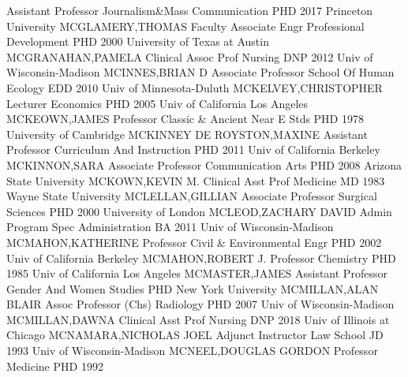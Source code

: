 \documentclass[
]{article}
\begin{document}
\textbar{}  \textbar Assistant Professor
\textbar Journalism\&Mass Communication \textbar PHD 2017 Princeton
University \textbar MCGLAMERY,THOMAS \textbar{} 
\textbar Faculty Associate \textbar Engr Professional Development
\textbar PHD 2000 University of Texas at Austin
\textbar MCGRANAHAN,PAMELA \textbar{}  \textbar Clinical
Assoc Prof \textbar Nursing \textbar DNP 2012 Univ of Wisconsin-Madison
\textbar MCINNES,BRIAN D \textbar{}  \textbar Associate
Professor \textbar School Of Human Ecology \textbar EDD 2010 Univ of
Minnesota-Duluth \textbar MCKELVEY,CHRISTOPHER \textbar{} 
\textbar Lecturer \textbar Economics \textbar PHD 2005 Univ of
California Los Angeles \textbar MCKEOWN,JAMES \textbar{} 
\textbar Professor \textbar Classic \& Ancient Near E Stds \textbar PHD
1978 University of Cambridge \textbar MCKINNEY DE ROYSTON,MAXINE
\textbar{}  \textbar Assistant Professor \textbar Curriculum
And Instruction \textbar PHD 2011 Univ of California Berkeley
\textbar MCKINNON,SARA \textbar{}  \textbar Associate
Professor \textbar Communication Arts \textbar PHD 2008 Arizona State
University \textbar MCKOWN,KEVIN M. \textbar{} 
\textbar Clinical Asst Prof \textbar Medicine \textbar MD 1983 Wayne
State University \textbar MCLELLAN,GILLIAN \textbar{} 
\textbar Associate Professor \textbar Surgical Sciences \textbar PHD
2000 University of London \textbar MCLEOD,ZACHARY DAVID \textbar{}
 \textbar Admin Program Spec \textbar Administration
\textbar BA 2011 Univ of Wisconsin-Madison \textbar MCMAHON,KATHERINE
\textbar{}  \textbar Professor \textbar Civil \&
Environmental Engr \textbar PHD 2002 Univ of California Berkeley
\textbar MCMAHON,ROBERT J. \textbar{}  \textbar Professor
\textbar Chemistry \textbar PHD 1985 Univ of California Los Angeles
\textbar MCMASTER,JAMES \textbar{}  \textbar Assistant
Professor \textbar Gender And Women Studies \textbar PHD New York
University \textbar MCMILLAN,ALAN BLAIR \textbar{} 
\textbar Assoc Professor (Chs) \textbar Radiology \textbar PHD 2007 Univ
of Wisconsin-Madison \textbar MCMILLAN,DAWNA \textbar{} 
\textbar Clinical Asst Prof \textbar Nursing \textbar DNP 2018 Univ of
Illinois at Chicago \textbar MCNAMARA,NICHOLAS JOEL \textbar{}
 \textbar Adjunct Instructor \textbar Law School \textbar JD
1993 Univ of Wisconsin-Madison \textbar MCNEEL,DOUGLAS GORDON \textbar{}
 \textbar Professor \textbar Medicine \textbar PHD 1992
\end{document}
